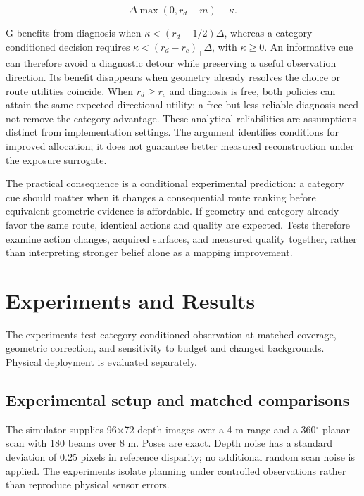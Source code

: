 \documentclass[11pt,a4paper]{article}
\providecommand{\hypertarget}[2]{#2}
\begin{document}
\[
\Delta\max(0,r_d-m)-\kappa.
\]

G benefits from diagnosis when \(\kappa<(r_d-1/2)\Delta\), whereas a category-conditioned decision requires \(\kappa<(r_d-r_c)_+\Delta\), with \(\kappa\ge0\). An informative cue can therefore avoid a diagnostic detour while preserving a useful observation direction. Its benefit disappears when geometry already resolves the choice or route utilities coincide. When \(r_d\ge r_c\) and diagnosis is free, both policies can attain the same expected directional utility; a free but less reliable diagnosis need not remove the category advantage. These analytical reliabilities are assumptions distinct from implementation settings. The argument identifies conditions for improved allocation; it does not guarantee better measured reconstruction under the exposure surrogate.

The practical consequence is a conditional experimental prediction: a category cue should matter when it changes a consequential route ranking before equivalent geometric evidence is affordable. If geometry and category already favor the same route, identical actions and quality are expected. Tests therefore examine action changes, acquired surfaces, and measured quality together, rather than interpreting stronger belief alone as a mapping improvement.

\hypertarget{experiments-and-results}{%
\section{Experiments and Results}\label{experiments-and-results}}

The experiments test category-conditioned observation at matched coverage, geometric correction, and sensitivity to budget and changed backgrounds. Physical deployment is evaluated separately.

\hypertarget{experimental-setup-and-matched-comparisons}{%
\subsection{Experimental setup and matched comparisons}\label{experimental-setup-and-matched-comparisons}}

The simulator supplies 96\ensuremath{\times}72 depth images over a 4 m range and a 360\ensuremath{^{\circ}} planar scan with 180 beams over 8 m. Poses are exact. Depth noise has a standard deviation of 0.25 pixels in reference disparity; no additional random scan noise is applied. The experiments isolate planning under controlled observations rather than reproduce physical sensor errors.
\end{document}

